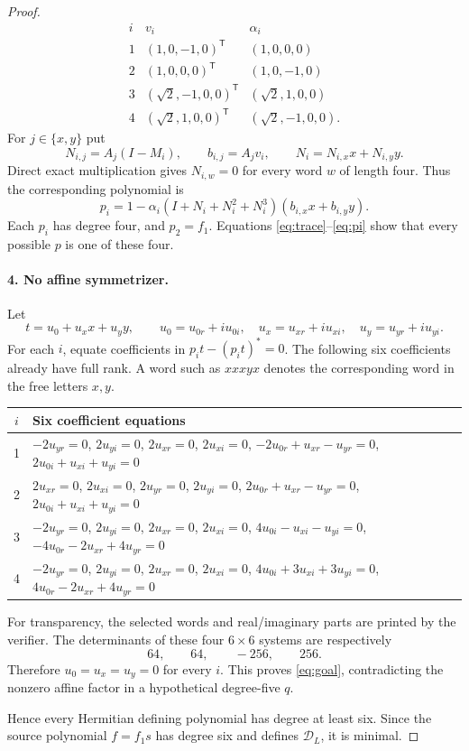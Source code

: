 \documentclass[11pt]{article}
\newcommand{\D}{\mathcal D}
\begin{document}
\begin{proof}
\[\begin{array}{c|c|c}
i&v_i&\alpha_i\\ \hline
1&(1,0,-1,0)^{\mathsf T}&(1,0,0,0)\\
2&(1,0,0,0)^{\mathsf T}&(1,0,-1,0)\\
3&(\sqrt2,-1,0,0)^{\mathsf T}&(\sqrt2,1,0,0)\\
4&(\sqrt2,1,0,0)^{\mathsf T}&(\sqrt2,-1,0,0).
\end{array}
\]
For $j\in\{x,y\}$ put
\[
N_{i,j}=A_j(I-M_i),\qquad b_{i,j}=A_jv_i,\qquad
N_i=N_{i,x}x+N_{i,y}y.
\]
Direct exact multiplication gives $N_{i,w}=0$ for every word $w$ of length four.  Thus the corresponding polynomial is
\begin{equation}\label{eq:pi}
p_i=1-\alpha_i(I+N_i+N_i^2+N_i^3)(b_{i,x}x+b_{i,y}y).
\end{equation}
Each $p_i$ has degree four, and $p_2=f_1$.  Equations \eqref{eq:trace}--\eqref{eq:pi} show that every possible $p$ is one of these four.

\paragraph{4. No affine symmetrizer.}
Let
\[
t=u_0+u_xx+u_yy,\qquad
u_0=u_{0r}+iu_{0i},\quad u_x=u_{xr}+iu_{xi},\quad u_y=u_{yr}+iu_{yi}.
\]
For each $i$, equate coefficients in $p_it-(p_it)^*=0$.  The following six coefficients already have full rank.  A word such as $xxxyx$ denotes the corresponding word in the free letters $x,y$.

\begin{center}\small
\renewcommand{\arraystretch}{1.15}
\begin{tabular}{c|l}
\toprule
$i$&Six coefficient equations\\
\midrule
1&$-2u_{yr}=0$, $2u_{yi}=0$, $2u_{xr}=0$, $2u_{xi}=0$, $-2u_{0r}+u_{xr}-u_{yr}=0$, $2u_{0i}+u_{xi}+u_{yi}=0$\\
2&$2u_{xr}=0$, $2u_{xi}=0$, $2u_{yr}=0$, $2u_{yi}=0$, $2u_{0r}+u_{xr}-u_{yr}=0$, $2u_{0i}+u_{xi}+u_{yi}=0$\\
3&$-2u_{yr}=0$, $2u_{yi}=0$, $2u_{xr}=0$, $2u_{xi}=0$, $4u_{0i}-u_{xi}-u_{yi}=0$, $-4u_{0r}-2u_{xr}+4u_{yr}=0$\\
4&$-2u_{yr}=0$, $2u_{yi}=0$, $2u_{xr}=0$, $2u_{xi}=0$, $4u_{0i}+3u_{xi}+3u_{yi}=0$, $4u_{0r}-2u_{xr}+4u_{yr}=0$\\
\bottomrule
\end{tabular}
\end{center}

For transparency, the selected words and real/imaginary parts are printed by the verifier.  The determinants of these four $6\times6$ systems are respectively
\[
64,\qquad64,\qquad-256,\qquad256.
\]
Therefore $u_0=u_x=u_y=0$ for every $i$.  This proves \eqref{eq:goal}, contradicting the nonzero affine factor in a hypothetical degree-five $q$.

Hence every Hermitian defining polynomial has degree at least six.  Since the source polynomial $f=f_1s$ has degree six and defines $\D_L$, it is minimal.  \qedhere
\end{proof}
\end{document}
